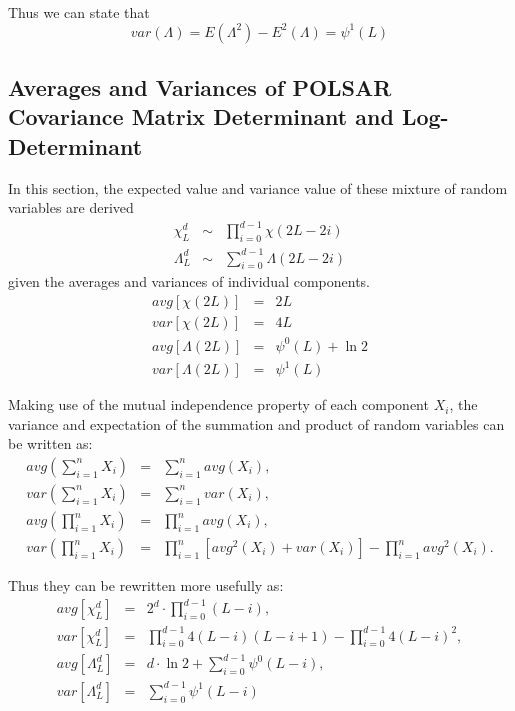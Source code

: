 \documentclass[journal,12pt,draftcls,onecolumn]{IEEEtran}
\begin{document}
Thus we can state that
\begin{equation}
var(\Lambda)=E(\Lambda^2)-E^2(\Lambda)=\psi^1(L)
\end{equation}

\subsection{Averages and Variances of POLSAR Covariance Matrix Determinant and Log-Determinant}

In this section, the expected value and variance value of these mixture of random variables are derived
\begin{eqnarray}
\chi^d_L &\sim& \prod_{i=0}^{d-1} \chi (2L-2i) \\
\Lambda^d_L &\sim& \sum_{i=0}^{d-1} \Lambda (2L-2i)
\end{eqnarray}
given the averages and variances of individual components.
\begin{eqnarray}
avg \left[ \chi(2L) \right]&=&2L \\
var \left[ \chi(2L) \right]&=&4L \\
avg \left[ \Lambda(2L) \right] &=& \psi^0(L) + \ln2 \\
var \left[ \Lambda(2L) \right] &=& \psi^1(L)
\end{eqnarray}

Making use of the mutual independence property of each component $X_i$,
  the variance and expectation of the summation and product of random variables can be written as:
\begin{eqnarray*}
avg \left( \sum^n_{i=1} X_i \right) &=& \sum^n_{i=1} avg(X_i), \\
var \left( \sum^n_{i=1} X_i \right) &=& \sum^n_{i=1} var(X_i), \\
avg \left( \prod^n_{i=1} X_i \right) &=& \prod^n_{i=1} avg(X_i), \\ 
var \left( \prod^n_{i=1} X_i \right) &=& \prod^n_{i=1} \left[ avg^2(X_i) + var(X_i) \right] - \prod^n_{i=1} avg^2(X_i).    
\end{eqnarray*}

Thus they can be rewritten more usefully as:
\begin{eqnarray*}
  avg \left[ \chi^d_L \right] &=& 2^d \cdot \prod^{d-1}_{i=0} (L-i), \\
  var \left[ \chi^d_L \right] &=& \prod^{d-1}_{i=0} 4(L-i)(L-i+1) - \prod^{d-1}_{i=0} 4(L-i)^2, \\
  avg \left[ \Lambda^d_L \right] &=& d \cdot \ln{2} + \sum^{d-1}_{i=0} \psi^0(L-i), \\
  var \left[ \Lambda^d_L \right] &=& \sum^{d-1}_{i=0} \psi^1(L-i)
\end{eqnarray*}
\end{document}

